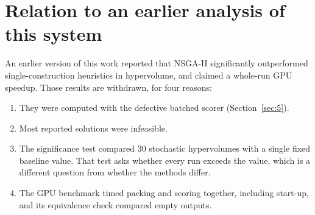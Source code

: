 \documentclass[journal]{IEEEtran}
\providecommand{\tightlist}{\setlength{\itemsep}{0pt}\setlength{\parskip}{0pt}}
\begin{document}
\appendix
\section{Relation to an earlier analysis of this system}\label{sec:appA}

An earlier version of this work reported that NSGA-II significantly outperformed single-construction heuristics in hypervolume, and claimed a whole-run GPU speedup. Those results are withdrawn, for four reasons:

\begin{enumerate}
\def\labelenumi{\arabic{enumi}.}
\tightlist
\item
  They were computed with the defective batched scorer (Section~\ref{sec:5}).
\item
  Most reported solutions were infeasible.
\item
  The significance test compared 30 stochastic hypervolumes with a single fixed baseline value. That test asks whether every run exceeds the value, which is a different question from whether the methods differ.
\item
  The GPU benchmark timed packing and scoring together, including start-up, and its equivalence check compared empty outputs.
\end{enumerate}
\end{document}
